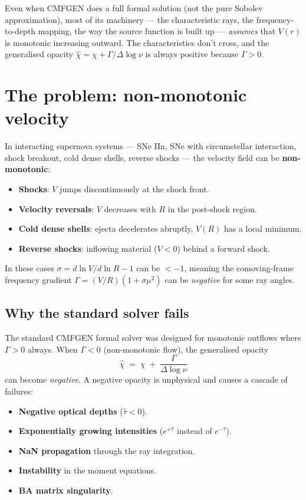 \documentclass[11pt]{article}
\begin{document}
Even when CMFGEN does a full formal solution (not the pure Sobolev
approximation), most of its machinery --- the characteristic rays, the
frequency-to-depth mapping, the way the source function is built up ---
\emph{assumes} that $V(r)$ is monotonic increasing outward.  The
characteristics don't cross, and the generalised opacity
$\hat\chi = \chi + \Gamma/\Delta\log\nu$ is always positive because
$\Gamma > 0$.

\section{The problem: non-monotonic velocity}

In interacting supernova systems --- SNe IIn, SNe with circumstellar
interaction, shock breakout, cold dense shells, reverse shocks --- the
velocity field can be \textbf{non-monotonic}:

\begin{itemize}[nosep]
  \item \textbf{Shocks}: $V$ jumps discontinuously at the shock front.
  \item \textbf{Velocity reversals}: $V$ decreases with $R$ in the
        post-shock region.
  \item \textbf{Cold dense shells}: ejecta decelerates abruptly, $V(R)$
        has a local minimum.
  \item \textbf{Reverse shocks}: inflowing material ($V < 0$) behind a
        forward shock.
\end{itemize}

In these cases $\sigma = d\ln V/d\ln R - 1$ can be $< -1$, meaning the
comoving-frame frequency gradient
$\Gamma = (V/R)(1 + \sigma\mu^{2})$ can be \emph{negative} for some ray
angles.

\subsection{Why the standard solver fails}

The standard CMFGEN formal solver was designed for monotonic outflows
where $\Gamma > 0$ always.  When $\Gamma < 0$ (non-monotonic flow), the
generalised opacity
\[
  \hat\chi \;=\; \chi \;+\; \frac{\Gamma}{\Delta\log\nu}
\]
can become \emph{negative}.  A negative opacity is unphysical and
causes a cascade of failures:

\begin{itemize}[nosep]
  \item \textbf{Negative optical depths} ($\hat\tau < 0$).
  \item \textbf{Exponentially growing intensities} ($e^{+\hat\tau}$
        instead of $e^{-\hat\tau}$).
  \item \textbf{NaN propagation} through the ray integration.
  \item \textbf{Instability} in the moment equations.
  \item \textbf{BA matrix singularity}.
\end{itemize}
\end{document}
